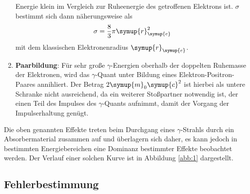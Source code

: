 \begin{enumerate}
  Energie klein im Vergleich zur Ruheenergie des getroffenen Elektrons ist. $\sigma$ bestimmt sich
  dann näherungsweise als
  \begin{equation}
    \sigma = \frac{8}{3} \pi \symup{r}_{\symup{e}}^2
  \end{equation}
  mit dem klassischen Elektronenradius $\symup{r}_{\symup{e}}$.
  \item \textbf{Paarbildung}: Für sehr große $\gamma$-Energien oberhalb der doppelten
  Ruhemasse der Elektronen, wird das $\gamma$-Quant unter Bildung eines Elektron-Positron-Paares
  annihliert. Der Betrag $2 \symup{m}_0 \symup{c}^2$ ist hierbei als untere Schranke
  nicht ausreichend, da ein weiterer Stoßpartner notwendig ist, der einen Teil des Impulses
  des $\gamma$-Quants aufnimmt, damit der Vorgang der Impulserhaltung genügt.
\end{enumerate}
Die oben genannten Effekte treten beim Durchgang eines $\gamma$-Strahls durch ein
Absorbermaterial zusammen auf und überlagern sich daher, es kann jedoch in bestimmten
Energiebereichen eine Dominanz bestimmter Effekte beobachtet werden. Der Verlauf einer solchen
Kurve ist in Abbildung \ref{abb:1} dargestellt.





\subsection{Fehlerbestimmung}